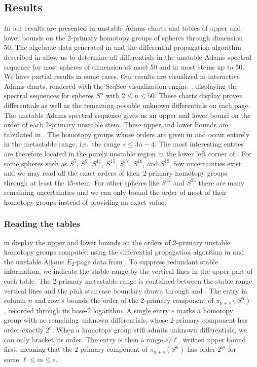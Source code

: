 \documentclass[dvipsnames,table]{amsart}
\theoremstyle{definition}
\theoremstyle{remark}
\numberwithin{equation}{section}
\begin{document}
\subsection{Results}
In  our results are presented in unstable Adams charts and tables of upper and lower bounds on the 2-primary homotopy groups of spheres through dimension 50. The algebraic data generated in  and the differential propagation algorithm described in  allow us to determine all differentials in the unstable Adams spectral sequence for most spheres of dimension at most 50 and in most stems up to 50. We have partial results in some cases. Our results are visualized in interactive Adams charts, rendered with the SeqSee visualization engine~\cite{Beauvais_Feisthauer_Isaksen_2025}, displaying the
spectral sequences for spheres $S^n$ with $2 \leq n \leq 50$. These charts display proven differentials as well as the remaining possible unknown differentials on each page. The unstable Adams spectral sequence gives us an upper and lower bound on the order of each $2$-primary unstable stem. These upper and lower bounds are tabulated in . The homotopy groups whose orders are given in  and  occur entirely in the metastable range, i.e.\ the range $s \leq 3n - 4$. The most interesting entries are therefore located in the purely unstable region in the lower left corner of . For some spheres such as $S^5$, $S^9$, $S^{11}$, $S^{13}$, $S^{17}$, $S^{18}$, and $S^{19}$, few uncertainties exist and we may read off the exact orders of their 2-primary homotopy groups through at least the 45-stem. For other spheres like $S^{12}$ and $S^{24}$ there are many remaining uncertainties and we can only bound the order of most of their homotopy groups instead of providing an exact value. 
\subsubsection{Reading the tables}
 in  display the upper and lower bounds on the orders of 2-primary unstable homotopy groups computed using the differential propagation algorithm in  and the unstable Adams $E_2$-page data from . To suppress redundant stable information, we indicate the stable range by the vertical lines in the upper part of each table. The 2-primary metastable range is contained between the stable range vertical lines and the pink staircase boundary drawn through  and . The entry in column $n$ and row $s$ bounds the order of the $2$-primary component of $\pi_{n+s}(S^n)$, recorded through its base-$2$ logarithm. A single entry $e$ marks a homotopy group with no remaining unknown differentials, whose $2$-primary component has order exactly $2^e$. When a homotopy group still admits unknown differentials, we can only bracket
its order. The entry is then a range $e/\ell$, written upper bound first,
meaning that the $2$-primary component of $\pi_{n+s}(S^n)$ has order $2^m$ for
some $\ell \le m \le e$.
\end{document}
